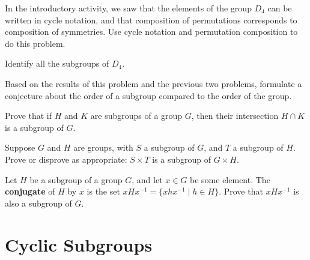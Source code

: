 \begin{problem}\label{prob:d4subgroups}
    In the introductory activity, we saw that the elements of the group $D_4$ can be written in cycle notation, and that composition of permutations corresponds to composition of symmetries. Use cycle notation and permutation composition to do this problem.
\begin{problemparts}
  \item Identify all the subgroups of \( D_4 \).
  \item Based on the results of this problem and the previous two problems, formulate a conjecture about the order of a subgroup compared to the order of the group.
\end{problemparts}
\end{problem}

\begin{problem}\label{prob:HKintersect}
Prove that if \(H\) and \(K\) are subgroups of a group \(G\), then their intersection \( H \cap K \) is a subgroup of \(G\).
\begin{annotation}
\end{annotation}
\end{problem}

\begin{problem}
Suppose \(G\) and \(H\) are groups, with \(S\) a subgroup of \(G\), and \(T\) a subgroup of \(H\). Prove or disprove as appropriate: \(S \times T\) is a subgroup of \(G \times H\).
\end{problem}

\begin{problem}\label{prob:conjugatesbgp}
Let $H$ be a subgroup of a group $G$, and let $x \in G$ be some element. The \textbf{conjugate} of $H$ by $x$ is the set $xHx^{-1} = \{ xhx^{-1} \mid h \in H \}$. Prove that $xHx^{-1}$ is also a subgroup of $G$.
\begin{annotation}
\end{annotation}
\end{problem}

\section{Cyclic Subgroups}

